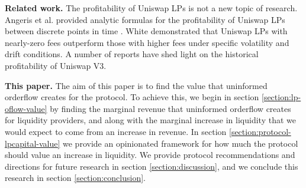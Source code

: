 




    \textbf{Related work.}
    The profitability of Uniswap LPs is not a new topic of research. 
    Angeris et al. provided analytic formulas for the profitability of Uniswap LPs between discrete points in time \cite{angeris2019analysis}. %
    White demonstrated that Uniswap LPs with nearly-zero fees outperform those with higher fees under specific volatility and drift conditions. %
    A number of reports have shed light on the historical profitability of Uniswap V3. %

    \textbf{This paper.} The aim of this paper is to find the value that uninformed orderflow creates for the protocol. To achieve this, we begin in section \ref{section:lp-oflow-value} by finding the marginal revenue that uninformed orderflow creates for liquidity providers, and along with the marginal increase in liquidity that we would expect to come from an increase in revenue. In section \ref{section:protocol-lpcapital-value} we provide an opinionated framework for how much the protocol should value an increase in liquidity. We provide protocol recommendations and directions for future research in section \ref{section:discussion}, and we conclude this research in section \ref{section:conclusion}.